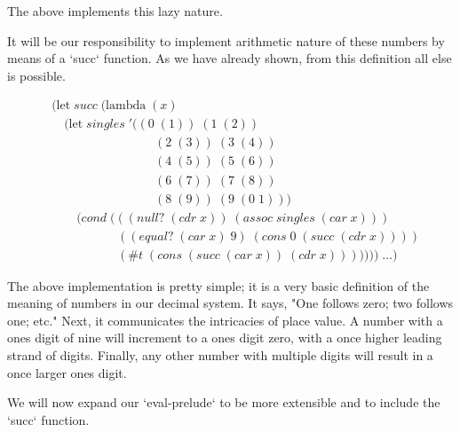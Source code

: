 The above implements this lazy nature.

It will be our responsibility to implement arithmetic nature of these numbers 
by means of a `succ` function. As we have already shown, from this definition 
all else is possible.

\begin{align*}
& (\text{let} \; succ \; (\text{lambda} \; (x)
\\& \quad (\text{let} \; singles \; '((0 \; (1)) \; (1 \; (2)) \; 
\\& \qquad \qquad \qquad \qquad \; (2 \; (3)) \; (3 \; (4)) \; 
\\& \qquad \qquad \qquad \qquad \; (4 \; (5)) \; (5 \; (6)) \; 
\\& \qquad \qquad \qquad \qquad \; (6 \; (7)) \; (7 \; (8)) \; 
\\& \qquad \qquad \qquad \qquad \; (8 \; (9)) \; (9 \; (0 \; 1)))
\\& \qquad (cond \; (((null? \; (cdr \; x)) \; (assoc \; singles \; (car \; x)))
\\& \qquad \qquad \quad \; ((equal? \; (car \; x) \; 9) \; (cons \; 0 \; (succ \; (cdr \; x))))
\\& \qquad \qquad \quad \; (\#t \; (cons \; (succ \; (car \; x)) \; (cdr \; x))))))) \; \dots)
\end{align*}

The above implementation is pretty simple; it is a very basic definition of 
the meaning of numbers in our decimal system. It says, "One follows zero; two 
follows one; etc." Next, it communicates the intricacies of place value. A 
number with a ones digit of nine will increment to a ones digit zero, with a 
once higher leading strand of digits. Finally, any other number with multiple 
digits will result in a once larger ones digit.

We will now expand our `eval-prelude` to be more extensible and to include 
the `succ` function.

